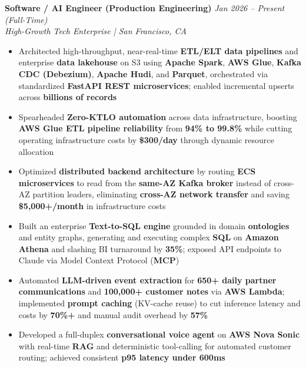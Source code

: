 \documentclass[10pt]{article}
\begin{document}
\textbf{Software / AI Engineer (Production Engineering)} \hfill \textcolor{subheadingcolor}{\textit{Jan 2026 -- Present (Full-Time)}} \\
\textit{High-Growth Tech Enterprise | San Francisco, CA}
\begin{itemize}
    \item Architected high-throughput, near-real-time \textbf{ETL/ELT data pipelines} and enterprise \textbf{data lakehouse} on S3 using \textbf{Apache Spark}, \textbf{AWS Glue}, \textbf{Kafka CDC (Debezium)}, \textbf{Apache Hudi}, and \textbf{Parquet}, orchestrated via standardized \textbf{FastAPI REST microservices}; enabled incremental upserts across \textbf{billions of records}
    \item Spearheaded \textbf{Zero-KTLO automation} across data infrastructure, boosting \textbf{AWS Glue ETL pipeline reliability} from \textbf{94\% to 99.8\%} while cutting operating infrastructure costs by \textbf{\$300/day} through dynamic resource allocation
    \item Optimized \textbf{distributed backend architecture} by routing \textbf{ECS microservices} to read from the \textbf{same-AZ Kafka broker} instead of cross-AZ partition leaders, eliminating \textbf{cross-AZ network transfer} and saving \textbf{\$5,000+/month} in infrastructure costs
    \item Built an enterprise \textbf{Text-to-SQL engine} grounded in domain \textbf{ontologies} and entity graphs, generating and executing complex \textbf{SQL} on \textbf{Amazon Athena} and slashing BI turnaround by \textbf{35\%}; exposed API endpoints to Claude via Model Context Protocol (\textbf{MCP})
    \item Automated \textbf{LLM-driven event extraction} for \textbf{650+ daily partner communications} and \textbf{100,000+ customer notes} via \textbf{AWS Lambda}; implemented \textbf{prompt caching} (KV-cache reuse) to cut inference latency and costs by \textbf{70\%+} and manual audit overhead by \textbf{57\%}
    \item Developed a full-duplex \textbf{conversational voice agent} on \textbf{AWS Nova Sonic} with real-time \textbf{RAG} and deterministic tool-calling for automated customer routing; achieved consistent \textbf{p95 latency under 600ms}
\end{itemize}
\vspace{-0.3em}
\end{document}
